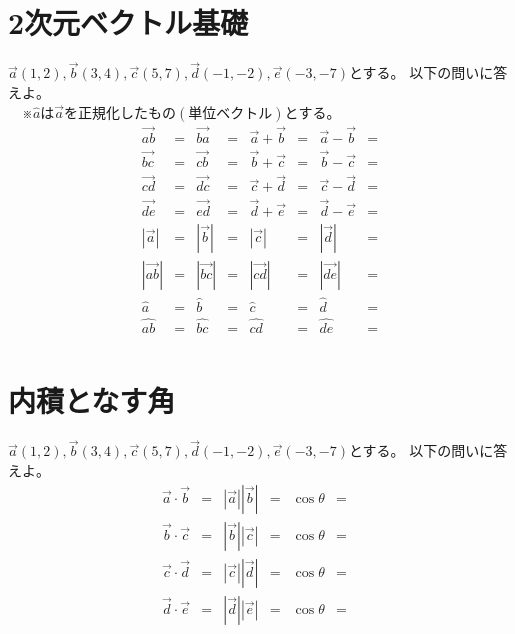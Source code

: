 \documentclass[paper=b4j,landscape,twocolumn,fleqn]{jlreq}
\begin{document}
\section{2次元ベクトル基礎}
$\vec{a}(1,2),　\vec{b}(3,4),　\vec{c}(5,7),　\vec{d}(-1,-2),　\vec{e}(-3,-7)$とする。
以下の問いに答えよ。\\
　※$\hat{a}は\vec{a}を正規化したもの(単位ベクトル)とする。$
\begin{align*}
\vec{ab} &= & \vec{ba} &= & \vec{a}+\vec{b} &= & \vec{a}-\vec{b} &= \\
\vec{bc} &= & \vec{cb} &= & \vec{b}+\vec{c} &= & \vec{b}-\vec{c} &= \\ 
\vec{cd} &= & \vec{dc} &= & \vec{c}+\vec{d} &= & \vec{c}-\vec{d} &= \\ 
\vec{de} &= & \vec{ed} &= & \vec{d}+\vec{e} &= & \vec{d}-\vec{e} &= \\
|\vec{a}| &= & |\vec{b}| &= & |\vec{c}| &= & |\vec{d}| &= \\
|\vec{ab}| &= & |\vec{bc}| &= & |\vec{cd}| &= & |\vec{de}| &= \\
\hat{a} &= & \hat{b} &= & \hat{c} &= & \hat{d} &= \\
\hat{ab} &= & \hat{bc} &= & \hat{cd} &= & \hat{de} &= \\
\end{align*}
\section{内積となす角}
$\vec{a}(1,2),　\vec{b}(3,4),　\vec{c}(5,7),　\vec{d}(-1,-2),　\vec{e}(-3,-7)$とする。
以下の問いに答えよ。\\
\begin{align*}
\vec{a} \cdot \vec{b} &= & |\vec{a}||\vec{b}| &= & \cos\theta &= &\\
\vec{b} \cdot \vec{c} &= & |\vec{b}||\vec{c}| &= & \cos\theta &= &\\
\vec{c} \cdot \vec{d} &= & |\vec{c}||\vec{d}| &= & \cos\theta &= &\\
\vec{d} \cdot \vec{e} &= & |\vec{d}||\vec{e}| &= & \cos\theta &= &\\
\end{align*}

\newpage
\end{document}
